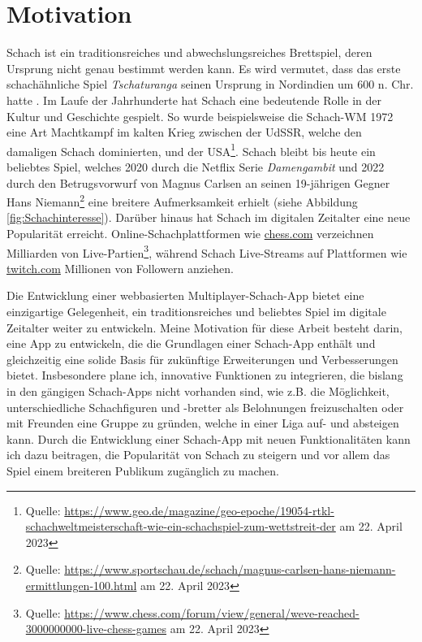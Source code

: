 \documentclass[a4paper,12pt]{report}
\begin{document}
    \section{Motivation}
    Schach ist ein traditionsreiches und abwechslungsreiches Brettspiel, deren Ursprung nicht genau bestimmt werden kann. Es wird vermutet, dass das erste schachähnliche Spiel  \textit{Tschaturanga} seinen Ursprung in Nordindien um 600 n. Chr. hatte \cite{schachgeschichte}.
    Im Laufe der Jahrhunderte hat Schach eine bedeutende Rolle in der Kultur und Geschichte gespielt. So wurde beispielsweise die Schach-WM 1972 eine Art Machtkampf im kalten Krieg zwischen der UdSSR, welche den damaligen Schach dominierten, und der USA\footnote{Quelle: \url{https://www.geo.de/magazine/geo-epoche/19054-rtkl-schachweltmeisterschaft-wie-ein-schachspiel-zum-wettstreit-der} am 22. April 2023}.
    Schach bleibt bis heute ein beliebtes Spiel, welches 2020 durch die Netflix Serie \textit{Damengambit} und 2022 durch den Betrugsvorwurf von Magnus Carlsen an seinen 19-jährigen Gegner Hans Niemann\footnote{Quelle: \url{https://www.sportschau.de/schach/magnus-carlsen-hans-niemann-ermittlungen-100.html} am 22. April 2023} eine breitere Aufmerksamkeit erhielt (siehe Abbildung \ref{fig:Schachinteresse}). 
     Darüber hinaus hat Schach im digitalen Zeitalter eine neue Popularität erreicht. Online-Schachplattformen wie \url{chess.com} verzeichnen Milliarden von Live-Partien\footnote{Quelle: \url{https://www.chess.com/forum/view/general/weve-reached-3000000000-live-chess-games} am 22. April 2023}, während Schach Live-Streams auf Plattformen wie \url{twitch.com} Millionen von Followern anziehen.
     
Die Entwicklung einer webbasierten Multiplayer-Schach-App bietet eine einzigartige Gelegenheit, ein traditionsreiches und beliebtes Spiel im digitale Zeitalter weiter zu entwickeln. Meine Motivation für diese Arbeit besteht darin, eine App zu entwickeln, die die Grundlagen einer Schach-App enthält und gleichzeitig eine solide Basis für zukünftige Erweiterungen und Verbesserungen bietet. Insbesondere plane ich, innovative Funktionen zu integrieren, die bislang in den gängigen Schach-Apps nicht vorhanden sind, wie z.B. die Möglichkeit, unterschiedliche Schachfiguren und -bretter als Belohnungen freizuschalten oder mit Freunden eine Gruppe zu gründen, welche in einer Liga auf- und absteigen kann. Durch die Entwicklung einer Schach-App mit neuen Funktionalitäten kann ich dazu beitragen, die Popularität von Schach zu steigern und vor allem das Spiel einem breiteren Publikum zugänglich zu machen.
\end{document}
